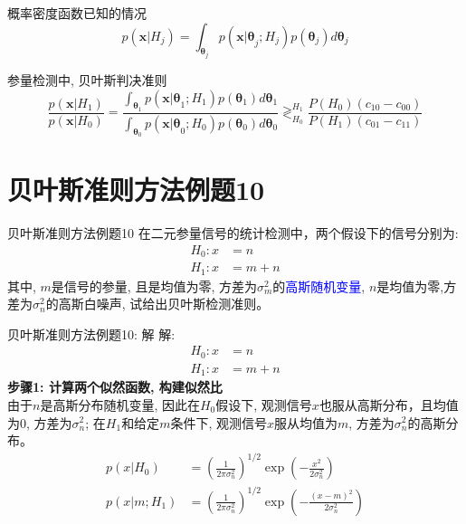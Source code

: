 \begin{frame}[shrink]{概率密度函数已知的情况}
\[ p(\bm{x}|H_j)=\int_{\bm{\theta}_j}p(\bm{x|\theta}_j; H_j)p(\bm{\theta}_j)d\bm{\theta}_j   \]
\begin{block}{参量检测中, 贝叶斯判决准则}
	\[ \frac{p(\bm{x}|H_1)}{p(\bm{x}|H_0)}=\frac{\int_{\bm{\theta}_1}p(\bm{x|\theta}_1; H_1)p(\bm{\theta}_1)d\bm{\theta}_1}{\int_{\bm{\theta}_0}p(\bm{x|\theta}_0; H_0)p(\bm{\theta}_0)d\bm{\theta}_0}\mathop{\gtrless}_{H_0}^{H_1}\frac{P(H_0)(c_{10}-c_{00})}{P(H_1)(c_{01}-c_{11})} \]
\end{block}
\end{frame}

\section{贝叶斯准则方法例题10}

\begin{frame}{贝叶斯准则方法例题10}
在二元参量信号的统计检测中，两个假设下的信号分别为:
\begin{align*}
H_0: x&=n  \\
H_1: x&=m+n
\end{align*}
其中, $m$是信号的参量, 且是均值为零, 方差为$\sigma_m^2$的\textcolor{blue}{高斯随机变量}, $n$是均值为零,方差为$\sigma_n^2$的高斯白噪声,  试给出贝叶斯检测准则。\\
\end{frame}

\begin{frame}[shrink]{贝叶斯准则方法例题10: 解}
解: 
\begin{align*}
H_0: x&=n\\
H_1: x&=m+n
\end{align*}
\textbf{步骤1: 计算两个似然函数, 构建似然比}\\
由于$n$是高斯分布随机变量, 因此在$H_0$假设下, 观测信号$x$也服从高斯分布，且均值为0, 方差为$\sigma_n^2$; 在$H_1$和给定$m$条件下, 观测信号$x$服从均值为$m$, 方差为$\sigma_n^2$的高斯分布。
\begin{align*}
p(x|H_0)&=\left(\frac{1}{2\pi\sigma_n^2}\right)^{1/2}\exp\left(-\frac{x^2}{2\sigma_n^2}\right)\\
p(x|m; H_1)&=\left(\frac{1}{2\pi\sigma_n^2}\right)^{1/2}\exp\left(-\frac{(x-m)^2}{2\sigma_n^2}\right)
\end{align*} 
\end{frame}

